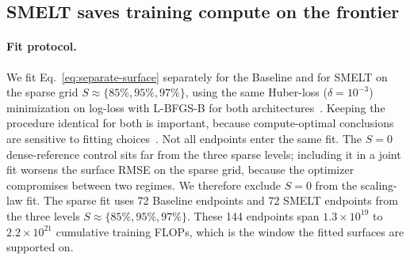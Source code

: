 \documentclass[]{bytedance_seed}
\newcommand{\archname}{SMELT}
\theoremstyle{definition}
\theoremstyle{remark}
\begin{document}
\FloatBarrier

\subsection{\archname{} saves training compute on the frontier}
\label{sec:scaling-results}

%

\paragraph{Fit protocol.}
We fit Eq.~\ref{eq:separate-surface} separately for the Baseline and for \archname{} on the sparse grid $S \approx \{85\%,95\%,97\%\}$, using the same Huber-loss ($\delta = 10^{-3}$) minimization on log-loss with L-BFGS-B for both architectures~\cite{hoffmann2022training}.
%
Keeping the procedure identical for both is important, because compute-optimal conclusions are sensitive to fitting choices~\cite{porian2024resolving}.
%
Not all endpoints enter the same fit.
%
The $S = 0$ dense-reference control sits far from the three sparse levels; including it in a joint fit worsens the surface RMSE on the sparse grid, because the optimizer compromises between two regimes.
%
We therefore exclude $S = 0$ from the scaling-law fit.
%
The sparse fit uses 72 Baseline endpoints and 72 \archname{} endpoints from the three levels $S \approx \{85\%,95\%,97\%\}$.
%
These 144 endpoints span $1.3 \times 10^{19}$ to $2.2 \times 10^{21}$ cumulative training FLOPs, which is the window the fitted surfaces are supported on.
%
\end{document}
